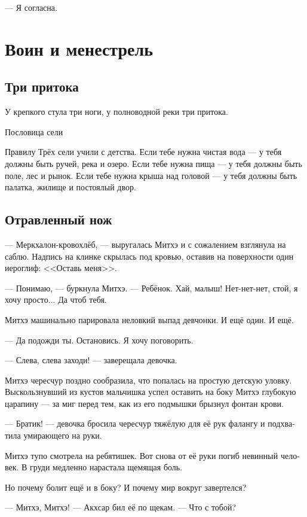 \documentclass[a4paper,12pt,fleqn]{book}\usepackage{polyglossia}\setdefaultlanguage[babelshorthands=true]{russian}\setotherlanguage{english}\defaultfontfeatures{Ligatures=TeX,Mapping=tex-text}\usepackage{xcolor}\newcommand{\ml}[3]{#2}
\begin{document}
{\ml{$0$}
{--- Я согласна.}
{``I accept it.''}

\chapter{Воин и менестрель}

\section{Три притока}

\epigraph{У крепкого стула три ноги, у полноводной реки три притока.}
{Пословица сели}

Правилу Трёх сели учили с детства.
Если тебе нужна чистая вода --- у тебя должны быть ручей, река и озеро.
Если тебе нужна пища --- у тебя должны быть поле, лес и рынок.
Если тебе нужна крыша над головой --- у тебя должны быть палатка, жилище и постоялый двор.

\section{Отравленный нож}

--- Меркхалон-кровохлёб, --- выругалась Митхэ и с сожалением взглянула на саблю.
Надпись на клинке скрылась под кровью, оставив на поверхности один иероглиф: <<Оставь меня>>.

--- Понимаю, --- буркнула Митхэ.
--- Ребёнок.
Хай, малыш!
Нет-нет-нет, стой, я хочу просто...
Да чтоб тебя.

Митхэ машинально парировала неловкий выпад девчонки.
И ещё один.
И ещё.

--- Да подожди ты.
Остановись.
Я хочу поговорить.

--- Слева, слева заходи! --- заверещала девочка.

Митхэ чересчур поздно сообразила, что попалась на простую детскую уловку.
Выскользнувший из кустов мальчишка успел оставить на боку Митхэ глубокую царапину --- за миг перед тем, как из его подмышки брызнул фонтан крови.

--- Братик! --- девочка бросила чересчур тяжёлую для её рук фалангу и подхватила умирающего на руки.

Митхэ тупо смотрела на ребятишек.
Вот снова от её руки погиб невинный человек.
В груди медленно нарастала щемящая боль.

Но почему болит ещё и в боку?
И почему мир вокруг завертелся?

--- Митхэ, Митхэ! --- Акхсар бил её по щекам.
--- Что с тобой?

}
\end{document}
